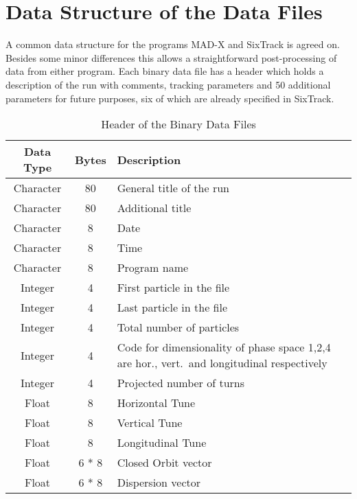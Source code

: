 \chapter{Data Structure of the Data Files} \label{Header}

A common data structure for the programs MAD-X and SixTrack is agreed on.
Besides some minor differences this allows a straightforward post-processing of data from either program.
Each binary data file has a header which holds a description of the run with comments, tracking parameters and 50 additional parameters for future purposes, six of which are already specified in SixTrack.

\begin{table}[h]
    \caption{Header of the Binary Data Files}
    \label{T-HDF}
    \centering
    \begin{tabular}{|c|c|>{\raggedright\arraybackslash}p{8cm}|}
        \hline
        \rowcolor{blue!30}
        \textbf{Data Type} & \textbf{Bytes} & \textbf{Description} \\
        \hline
        Character & 80 & General title of the run \\
        \hline
        Character & 80 & Additional title \\
        \hline
        Character & 8 & Date \\
        \hline
        Character & 8 & Time \\
        \hline
        Character & 8 & Program name \\
        \hline
        Integer & 4 & First particle in the file \\
        \hline
        Integer & 4 & Last particle in the file \\
        \hline
        Integer & 4 & Total number of particles \\
        \hline
        Integer & 4 & Code for dimensionality of phase space 1,2,4 are hor., vert.\ and longitudinal respectively \\
        \hline
        Integer & 4 & Projected number of turns \\
        \hline
        Float & 8 & Horizontal Tune \\
        \hline
        Float & 8 & Vertical Tune \\
        \hline
        Float & 8 & Longitudinal Tune \\
        \hline
        Float & 6 * 8 & Closed Orbit vector \\
        \hline
        Float & 6 * 8 & Dispersion vector \\

\end{tabular}
\end{table}
